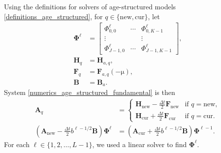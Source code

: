 \documentclass[USenglish]{article}
\renewcommand{\vec}[1]{\boldsymbol{\mathrm{#1}}}
\newcommand{\mat}[1]{\mathbf{#1}}
\begin{document}
Using the definitions for solvers of age-structured models
\eqref{definitions_age_structured},
for $q \in \{\mathrm{new}, \mathrm{cur}\}$, let
\begin{subequations}
  \begin{align}
    \mat{\Phi}^{\ell}
    &=
    \begin{bmatrix}
      \Phi_{0, 0}^{\ell} & \cdots & \Phi_{0, K - 1}^{\ell} \\
      \vdots & & \vdots \\
      \Phi_{J - 1, 0}^{\ell} & \cdots & \Phi_{J - 1, K - 1}^{\ell}
    \end{bmatrix},
    \\
    \mat{H}_q &= \mat{H}_{a, q},
    \\
    \mat{F}_q &= \mat{F}_{a, q}(-\vec{\mu}),
    \\
    \mat{B} &= \mat{B}_a.
  \end{align}
\end{subequations}
System \eqref{numerics_age_structured_fundamental} is then
\begin{subequations}
  \begin{align}
    \mat{A}_q &=
    \begin{cases}
      \mat{H}_{\mathrm{new}} - \frac{\Delta t}{2} \mat{F}_{\mathrm{new}}
      & \text{if $q = \mathrm{new}$},
      \\
      \mat{H}_{\mathrm{cur}} + \frac{\Delta t}{2} \mat{F}_{\mathrm{cur}}
      & \text{if $q = \mathrm{cur}$}.
    \end{cases}
    \\
    \left(
      \mat{A}_{\mathrm{new}}
      - \frac{\Delta t}{2} b^{\ell - 1 / 2} \mat{B}
    \right)
    \mat{\Phi}^{\ell} &=
    \left(
      \mat{A}_{\mathrm{cur}}
      + \frac{\Delta t}{2} b^{\ell - 1 / 2} \mat{B}
    \right)
    \mat{\Phi}^{\ell - 1}.
  \end{align}
\end{subequations}
For each $\ell \in \{1, 2, \ldots, L - 1\}$, we used a linear solver
to find $\mat{\Phi}^{\ell}$.
\end{document}
